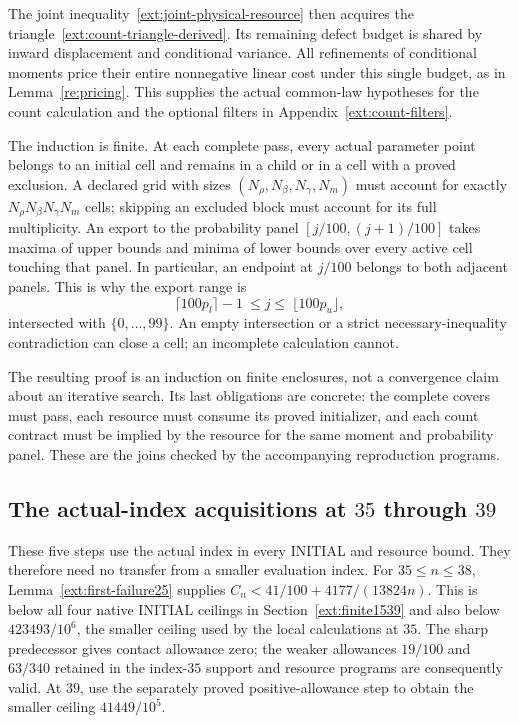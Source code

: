 The joint inequality~\eqref{ext:joint-physical-resource} then acquires
the triangle~\eqref{ext:count-triangle-derived}. Its remaining defect
budget is shared by inward displacement and conditional variance.
All refinements of conditional moments price their entire nonnegative
linear cost under this single budget, as in Lemma~\ref{re:pricing}.
This supplies the actual common-law hypotheses for the count calculation
and the optional filters in Appendix~\ref{ext:count-filters}.

The induction is finite. At each complete pass, every actual parameter
point belongs to an initial cell and remains in a child or in a cell
with a proved exclusion. A declared grid with sizes
$(N_\rho,N_\beta,N_\gamma,N_m)$ must account for exactly
$N_\rho N_\beta N_\gamma N_m$ cells; skipping an excluded block must
account for its full multiplicity. An export to the probability panel
$[j/100,(j+1)/100]$ takes maxima of upper bounds and minima of lower
bounds over every active cell touching that panel. In particular,
an endpoint at $j/100$ belongs to both adjacent panels. This is why
the export range is
\[
 \lceil100p_l\rceil-1\ \le j\le\ \lfloor100p_u\rfloor,
\]
intersected with $\{0,\ldots,99\}$. An empty intersection or a strict
necessary-inequality contradiction can close a cell; an incomplete
calculation cannot.

The resulting proof is an induction on finite enclosures, not a
convergence claim about an iterative search. Its last obligations are
concrete: the complete covers must pass, each resource must consume its
proved initializer, and each count contract must be implied by the
resource for the same moment and probability panel. These are the joins
checked by the accompanying reproduction programs.

\subsection{The actual-index acquisitions at $35$ through $39$}
\label{ext:actual3539-acquisition}
These five steps use the actual index in every INITIAL and resource
bound. They therefore need no transfer from a smaller evaluation index.
For $35\le n\le38$, Lemma~\ref{ext:first-failure25} supplies
$C_n<41/100+4177/(13824n)$. This is below all four native INITIAL
ceilings in Section~\ref{ext:finite1539} and also below $423493/10^6$, the smaller
ceiling used by the local calculations at $35$.
The sharp predecessor gives contact allowance zero; the weaker allowances
$19/100$ and $63/340$ retained in the index-$35$ support and resource
programs are consequently valid. At $39$, use the separately proved
positive-allowance step to obtain the smaller ceiling $41449/10^5$.

